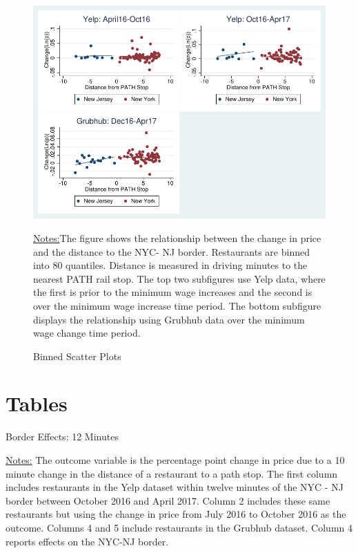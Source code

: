 \documentclass[11pt]{article}
\begin{document}
\newpage
\begin{figure}[H]
\centering
\caption{Binned Scatter Plots}
\includegraphics[width=6in]{path_plots.pdf}


{\footnotesize \raggedright \underline{Notes:}The figure shows the relationship between the change in price and the distance to the NYC- NJ border. Restaurants are binned into 80 quantiles. Distance is measured in driving minutes to the nearest PATH rail stop. The top two subfigures use Yelp data, where the first is prior to the minimum wage increases and the second is over the minimum wage increase time period. The bottom subfigure displays the relationship using Grubhub data over the minimum wage change time period. \par}
\end{figure}

\newpage

\section{Tables}

\begin{table}[H]
\centering
\caption{Border Effects: 12 Minutes}

{\footnotesize \raggedright \underline{Notes:} 
The outcome variable is the percentage point change in price due to a 10 minute change in the distance of a restaurant to a path stop. The first column includes restaurants in the Yelp dataset within twelve minutes of the NYC - NJ border between October 2016 and April 2017. Column 2 includes these same restaurants but using the change in price from July 2016 to October 2016 as the outcome. Columns 4 and 5 include restaurants in the Grubhub dataset. Column 4 reports effects on the NYC-NJ border. \par
}
\end{table}
\end{document}
